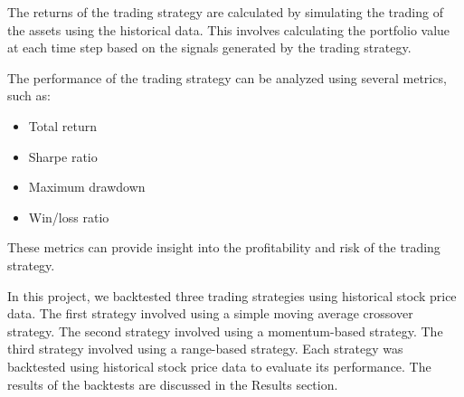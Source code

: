 The returns of the trading strategy are calculated by simulating the trading of the assets using the historical data. This involves calculating the portfolio value at each time step based on the signals generated by the trading strategy.

The performance of the trading strategy can be analyzed using several metrics, such as:

\begin{itemize}
\item Total return
\item Sharpe ratio
\item Maximum drawdown
\item Win/loss ratio
\end{itemize}

These metrics can provide insight into the profitability and risk of the trading strategy.

In this project, we backtested three trading strategies using historical stock price data. The first strategy involved using a simple moving average crossover strategy. The second strategy involved using a momentum-based strategy. The third strategy involved using a range-based strategy. Each strategy was backtested using historical stock price data to evaluate its performance. The results of the backtests are discussed in the Results section.
